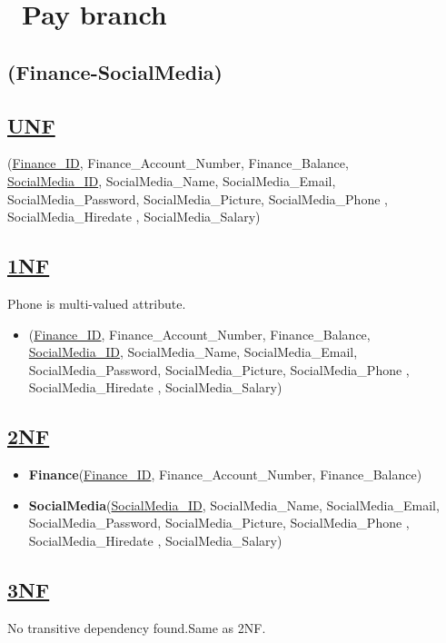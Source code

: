 \section{\texorpdfstring{\ Pay branch}{Pay branch}}
\hrulefill
\subsection{\texorpdfstring{\centering (Finance-SocialMedia)}{(Finance-SocialMedia)}}

\subsection*{\underline{UNF}}

(\underline{Finance\_ID}, Finance\_Account\_Number, Finance\_Balance,\\
\underline{SocialMedia\_ID}, SocialMedia\_Name, SocialMedia\_Email, SocialMedia\_Password, SocialMedia\_Picture, SocialMedia\_Phone ,  SocialMedia\_Hiredate , SocialMedia\_Salary)

\subsection*{\underline{1NF}}
Phone is multi-valued attribute.
\vskip 0.2in

\begin{itemize}
    \item
          (\underline{Finance\_ID}, Finance\_Account\_Number, Finance\_Balance,\\
          \underline{SocialMedia\_ID}, SocialMedia\_Name, SocialMedia\_Email, SocialMedia\_Password, SocialMedia\_Picture, SocialMedia\_Phone ,  SocialMedia\_Hiredate , SocialMedia\_Salary)
\end{itemize}

\subsection*{\underline{2NF}}
\begin{itemize}
    \item \textbf{Finance}(\underline{Finance\_ID}, Finance\_Account\_Number, Finance\_Balance)
    \item \textbf{SocialMedia}(\underline{SocialMedia\_ID}, SocialMedia\_Name, SocialMedia\_Email, SocialMedia\_Password, SocialMedia\_Picture, SocialMedia\_Phone ,  SocialMedia\_Hiredate , SocialMedia\_Salary)
\end{itemize}

\subsection*{\underline{3NF}}
No transitive dependency found.Same as 2NF.

